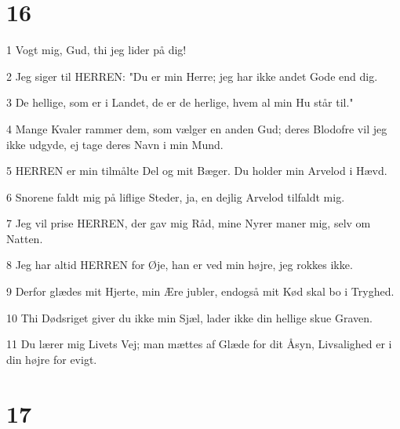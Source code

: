 \chapter{16}

\par 1 Vogt mig, Gud, thi jeg lider på dig!
\par 2 Jeg siger til HERREN: "Du er min Herre; jeg har ikke andet Gode end dig.
\par 3 De hellige, som er i Landet, de er de herlige, hvem al min Hu står til."
\par 4 Mange Kvaler rammer dem, som vælger en anden Gud; deres Blodofre vil jeg ikke udgyde, ej tage deres Navn i min Mund.
\par 5 HERREN er min tilmålte Del og mit Bæger. Du holder min Arvelod i Hævd.
\par 6 Snorene faldt mig på liflige Steder, ja, en dejlig Arvelod tilfaldt mig.
\par 7 Jeg vil prise HERREN, der gav mig Råd, mine Nyrer maner mig, selv om Natten.
\par 8 Jeg har altid HERREN for Øje, han er ved min højre, jeg rokkes ikke.
\par 9 Derfor glædes mit Hjerte, min Ære jubler, endogså mit Kød skal bo i Tryghed.
\par 10 Thi Dødsriget giver du ikke min Sjæl, lader ikke din hellige skue Graven.
\par 11 Du lærer mig Livets Vej; man mættes af Glæde for dit Åsyn, Livsalighed er i din højre for evigt.

\chapter{17}

